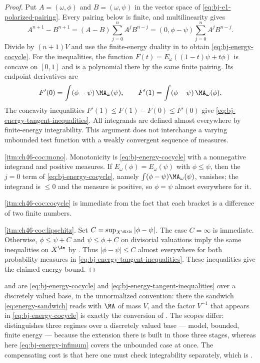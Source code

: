 \begin{proof}
Put $A=(\omega,\phi)$ and $B=(\omega,\psi)$ in the vector space of
\eqref{eq:bj-e1-polarized-pairing}.  Every pairing below is finite, and
multilinearity gives
\[
 A^{n+1}-B^{n+1}
   =(A-B)\sum_{j=0}^n A^jB^{n-j}
   =(0,\phi-\psi)\sum_{j=0}^n A^jB^{n-j}.
\]
Divide by $(n+1)V$ and use the finite-energy duality in
 to obtain \eqref{eq:bj-energy-cocycle}.
For the inequalities, the function
$F(t)=E_\omega((1-t)\psi+t\phi)$ is concave on $[0,1]$ and is a
polynomial there by the same finite pairing.  Its endpoint derivatives
are
\[
 F'(0)=\int(\phi-\psi)\,\MA_\omega(\psi),
 \qquad F'(1)=\int(\phi-\psi)\,\MA_\omega(\phi).
\]
The concavity inequalities $F'(1)\leq F(1)-F(0)\leq F'(0)$ give
\eqref{eq:bj-energy-tangent-inequalities}.
All integrands are defined almost everywhere by finite-energy
integrability.  This argument does not interchange a varying unbounded
test function with a weakly convergent sequence of measures.

\cref{itm:ch46-coc:mono}.  Monotonicity is
\eqref{eq:bj-energy-cocycle} with a nonnegative integrand and positive
measures.  If $E_\omega(\phi)=E_\omega(\psi)$ with $\phi\le\psi$, then
the $j=0$ term of \eqref{eq:bj-energy-cocycle}, namely
$\int(\phi-\psi)\MA_\omega(\psi)$, vanishes; the integrand is
$\le0$ and the measure is positive, so $\phi=\psi$ almost everywhere
for it.

\cref{itm:ch46-coc:cocycle} is immediate from the fact that each bracket is
a difference of two finite numbers.

\cref{itm:ch46-coc:lipschitz}.  Set
$C=\sup_{X^{\divis}}|\phi-\psi|$.  The case $C=\infty$ is immediate.
Otherwise, $\phi\leq\psi+C$ and $\psi\leq\phi+C$ on divisorial
valuations imply the same inequalities on $X^{\An}$ by
.  Thus
$|\phi-\psi|\leq C$ almost everywhere for both probability measures
in \eqref{eq:bj-energy-tangent-inequalities}.  These inequalities give
the claimed energy bound.
\end{proof}

\begin{remark}
\label{rem:ch46-cocycle-part3}
 and  are
\eqref{eq:bj-energy-cocycle} and
\eqref{eq:bj-energy-tangent-inequalities} over a discretely valued base,
in the unnormalized convention: there the sandwich
\eqref{eq:energy-sandwich} reads with $\MA$ of mass $V$, and the
factor $V^{-1}$ that appears in \eqref{eq:bj-energy-cocycle} is exactly
the conversion of .  The scopes differ:
 distinguishes three regimes over a discretely
valued base --- model, bounded, finite energy --- because the extension
there is built in those three stages, whereas here
\eqref{eq:bj-energy-infimum} covers the unbounded case at once.  The
compensating cost is that here one must check integrability separately,
which is .
\end{remark}

